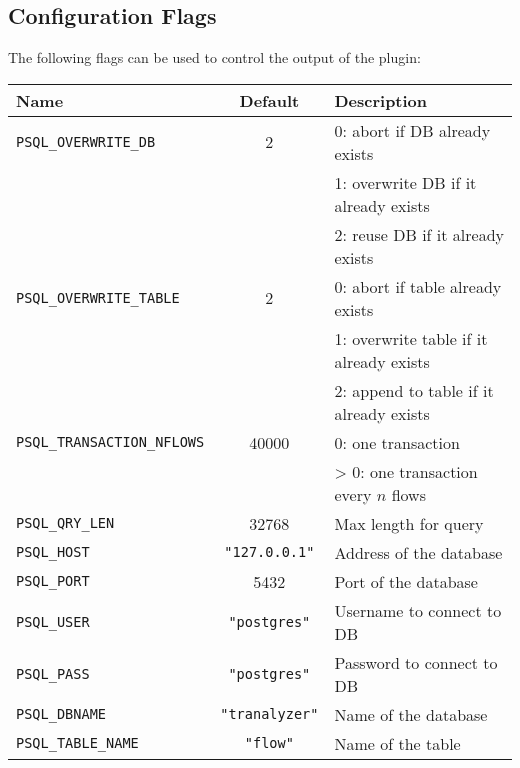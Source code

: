 \documentclass[documentation]{subfiles}
\begin{document}
\subsection{Configuration Flags}
The following flags can be used to control the output of the plugin:
\begin{longtable}{lcl}
    \toprule
    {\bf Name} & {\bf Default} & {\bf Description}\\
    \midrule\endhead%
    {\tt PSQL\_OVERWRITE\_DB}       & 2                  & 0: abort if DB already exists\\
                                    &                    & 1: overwrite DB if it already exists\\
                                    &                    & 2: reuse DB if it already exists\\
    {\tt PSQL\_OVERWRITE\_TABLE}    & 2                  & 0: abort if table already exists\\
                                    &                    & 1: overwrite table if it already exists\\
                                    &                    & 2: append to table if it already exists\\
    {\tt PSQL\_TRANSACTION\_NFLOWS} & 40000              & 0: one transaction\\
                                    &                    & > 0: one transaction every $n$ flows\\
    {\tt PSQL\_QRY\_LEN}            & 32768              & Max length for query\\
    {\tt PSQL\_HOST}                & {\tt "127.0.0.1"}  & Address of the database\\
    {\tt PSQL\_PORT}                & 5432               & Port of the database\\
    {\tt PSQL\_USER}                & {\tt "postgres"}   & Username to connect to DB\\
    {\tt PSQL\_PASS}                & {\tt "postgres"}   & Password to connect to DB\\
    {\tt PSQL\_DBNAME}              & {\tt "tranalyzer"} & Name of the database\\
    {\tt PSQL\_TABLE\_NAME}         & {\tt "flow"}       & Name of the table\\
    \bottomrule
\end{longtable}
\end{document}
